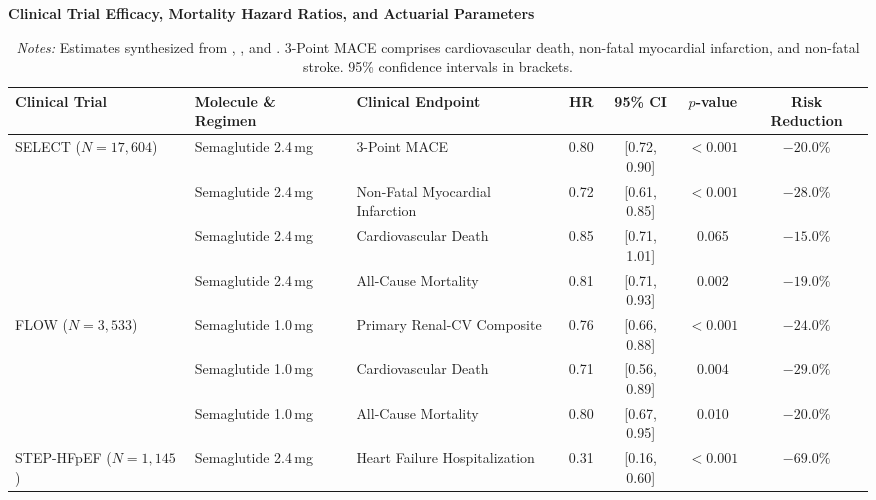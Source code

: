 \documentclass[11pt,a4paper]{article}
\begin{document}
\begin{table}[htbp]
\centering
\small
\caption{\textbf{Clinical Trial Efficacy, Mortality Hazard Ratios, and Actuarial Parameters}}
\label{tab:clinical}
\setlength{\tabcolsep}{5pt}
\begin{adjustbox}{max width=\textwidth}
\begin{tabular}{lllcccc}
\toprule
\textbf{Clinical Trial} & \textbf{Molecule \& Regimen} & \textbf{Clinical Endpoint} & \textbf{HR} & \textbf{95\% CI} & \textbf{$p$-value} & \textbf{Risk Reduction} \\
\midrule
SELECT ($N = 17,604$) & Semaglutide 2.4\,mg & 3-Point MACE & 0.80 & [0.72, 0.90] & $< 0.001$ & $-20.0\%$ \\
 & Semaglutide 2.4\,mg & Non-Fatal Myocardial Infarction & 0.72 & [0.61, 0.85] & $< 0.001$ & $-28.0\%$ \\
 & Semaglutide 2.4\,mg & Cardiovascular Death & 0.85 & [0.71, 1.01] & 0.065 & $-15.0\%$ \\
 & Semaglutide 2.4\,mg & All-Cause Mortality & 0.81 & [0.71, 0.93] & 0.002 & $-19.0\%$ \\
\addlinespace
FLOW ($N = 3,533$) & Semaglutide 1.0\,mg & Primary Renal-CV Composite & 0.76 & [0.66, 0.88] & $< 0.001$ & $-24.0\%$ \\
 & Semaglutide 1.0\,mg & Cardiovascular Death & 0.71 & [0.56, 0.89] & 0.004 & $-29.0\%$ \\
 & Semaglutide 1.0\,mg & All-Cause Mortality & 0.80 & [0.67, 0.95] & 0.010 & $-20.0\%$ \\
\addlinespace
STEP-HFpEF ($N = 1,145$) & Semaglutide 2.4\,mg & Heart Failure Hospitalization & 0.31 & [0.16, 0.60] & $< 0.001$ & $-69.0\%$ \\
\bottomrule
\end{tabular}
\end{adjustbox}
\vspace{0.4em}
\caption*{\footnotesize \textit{Notes:} Estimates synthesized from \citet{lincoff2023semaglutide}, \citet{perkovic2024effects}, and \citet{kosiborod2023semaglutide}. 3-Point MACE comprises cardiovascular death, non-fatal myocardial infarction, and non-fatal stroke. 95\% confidence intervals in brackets.}
\end{table}
\end{document}

